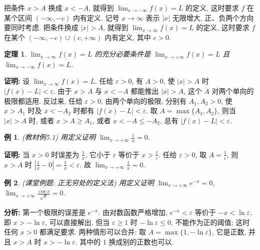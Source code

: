 \documentclass[UTF8,openany]{ctexbook}
\theoremstyle{chinesetextbook}
\newtheorem{example}{例}[section]
\newtheorem{theorem}{定理}[section]
\newenvironment{cnproof}{\par\indent\textbf{证明:} \ignorespaces}{\par}
\begin{document}
把条件 $x>A$ 换成 $x<-A$, 就得到 $\displaystyle\lim_{x\to-\infty}f(x)=L$ 的定义, 这时要求 $f$ 在某个区间 $(-\infty,-c)$ 内有定义. 记号 $x\to\infty$ 表示 $|x|$ 无限增大, 正、负两个方向要同时考虑. 把条件换成 $|x|>A$, 就得到 $\displaystyle\lim_{x\to\infty}f(x)=L$ 的定义, 这时要求 $f$ 在某个 $(-\infty,-c)\cup(c,+\infty)$ 内有定义, 其中 $c>0$.
\begin{theorem}
$\displaystyle\lim_{x\to\infty}f(x)=L$ 的充分必要条件是 $\displaystyle\lim_{x\to+\infty}f(x)=L$ 且 $\displaystyle\lim_{x\to-\infty}f(x)=L$.
\end{theorem}
\begin{cnproof}
设 $\displaystyle\lim_{x\to\infty}f(x)=L$. 任给 $\varepsilon>0$, 有 $A>0$, 使 $|x|>A$ 时 $|f(x)-L|<\varepsilon$. 由于 $x>A$ 与 $x<-A$ 都能推出 $|x|>A$, 这个 $A$ 对两个单向的极限都适用. 反过来, 任给 $\varepsilon>0$, 由两个单向的极限, 分别有 $A_1,A_2>0$, 使 $x>A_1$ 时及 $x<-A_2$ 时都有 $|f(x)-L|<\varepsilon$. 取 $A=\max\{A_1,A_2\}$, 则当 $|x|>A$ 时, 或者 $x>A\ge A_1$, 或者 $x<-A\le-A_2$, 总有 $|f(x)-L|<\varepsilon$.
\end{cnproof}
\begin{example}
\textnormal{(教材例5.1)} 用定义证明 $\displaystyle\lim_{x\to+\infty}\frac1x=0$.
\end{example}
\begin{cnproof}
当 $x>0$ 时误差为 $\displaystyle\frac1x$, 它小于 $\varepsilon$ 等价于 $\displaystyle x>\frac1\varepsilon$. 任给 $\varepsilon>0$, 取 $\displaystyle A=\frac1\varepsilon$, 则 $x>A$ 时 $\displaystyle\left|\frac1x-0\right|=\frac1x<\varepsilon$. 故 $\displaystyle\lim_{x\to+\infty}\frac1x=0$.
\end{cnproof}
\begin{example}
\textnormal{(课堂例题: 正无穷处的定义法)} 用定义证明 $\displaystyle\lim_{x\to+\infty}e^{-x}=0$, $\displaystyle\lim_{x\to+\infty}\frac{\cos x}{\sqrt x}=0$.
\end{example}
\par\indent\textbf{分析:} 第一个极限的误差是 $e^{-x}$. 由对数函数严格增加, $e^{-x}<\varepsilon$ 等价于 $-x<\ln\varepsilon$, 即 $x>-\ln\varepsilon$, 可以直接解出. 但当 $\varepsilon\ge1$ 时 $-\ln\varepsilon\le0$, 不能作为正的阈值; 这时任何 $x>0$ 都满足要求. 两种情形可以合并: 取 $A=\max\{1,-\ln\varepsilon\}$, 它是正数, 并且 $x>A$ 时 $x>-\ln\varepsilon$. 其中的 $1$ 换成别的正数也可以.
\end{document}
